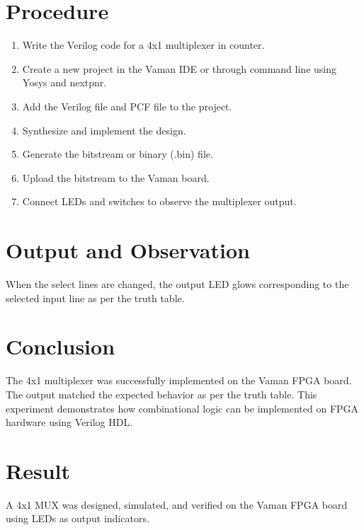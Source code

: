 \documentclass[a4paper,12pt]{article}
\begin{document}
\section*{Procedure}
\begin{enumerate}
    \item Write the Verilog code for a 4x1 multiplexer in counter.
    \item Create a new project in the Vaman IDE or through command line using Yosys and nextpnr.
    \item Add the Verilog file and PCF file to the project.
    \item Synthesize and implement the design.
    \item Generate the bitstream or binary (.bin) file.
    \item Upload the bitstream to the Vaman board.
    \item Connect LEDs and switches to observe the multiplexer output.
\end{enumerate}

\section*{Output and Observation}
When the select lines are changed, the output LED glows corresponding to the selected input line as per the truth table.

\section*{Conclusion}
The 4x1 multiplexer was successfully implemented on the Vaman FPGA board. The output matched the expected behavior as per the truth table. This experiment demonstrates how combinational logic can be implemented on FPGA hardware using Verilog HDL.

\section*{Result}
A 4x1 MUX was designed, simulated, and verified on the Vaman FPGA board using LEDs as output indicators.
\end{document}

